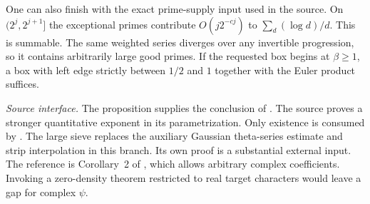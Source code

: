 One can also finish with the exact prime-supply input used in the source. On $(2^j,2^{j+1}]$ the exceptional primes contribute $O(j2^{-cj})$ to $\sum_d (\log d)/d$. This is summable. The same weighted series diverges over any invertible progression, so it contains arbitrarily large good primes. If the requested box begins at $\beta\ge1$, a box with left edge strictly between $1/2$ and $1$ together with the Euler product suffices.

\noindent\textit{Source interface.} The proposition supplies the conclusion of . The source proves a stronger quantitative exponent in its parametrization. Only existence is consumed by . The large sieve replaces the auxiliary Gaussian theta-series estimate and strip interpolation in this branch. Its own proof is a substantial external input. The reference is Corollary~2 of \cite{HB}, which allows arbitrary complex coefficients. Invoking a zero-density theorem restricted to real target characters would leave a gap for complex $\psi$.
